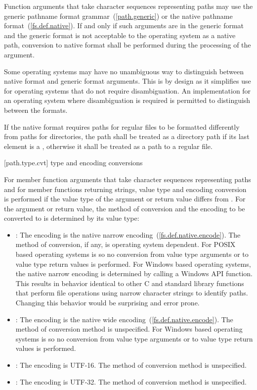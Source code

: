 \pnum
Function arguments that take character sequences representing
paths may use the generic pathname format grammar~(\ref{path.generic}) or
the native pathname format~(\ref{fs.def.native}). If and only if such
arguments are in the generic format and the generic format is not acceptable to
the operating system as a native path, conversion to native format shall be
performed during the processing of the argument.

\pnum
\enternote
Some operating systems may have no unambiguous way to distinguish between native format and generic format arguments.
This is by design as it simplifies use for operating systems that do not require
disambiguation. An implementation for an operating system where disambiguation
is required is permitted to distinguish between the formats.
\exitnote

\pnum
If the native format requires paths for regular files to be formatted
differently from paths for directories, the path shall be treated as a directory
path if its last element is a ,
otherwise it shall be treated as a path to a regular file.

[path.type.cvt]{ type and encoding conversions}

\pnum
For member function arguments that take character sequences representing
paths and for member functions returning strings, value type and encoding
conversion is performed if the value type of the argument or return value differs from
.
For the argument or return value, the method of conversion and the encoding 
to be converted to is determined
by its value type:
\begin{itemize}
\item {}: The encoding is the native narrow encoding~(\ref{fs.def.native.encode}).
The method of conversion, if any, is operating system dependent.
\enternote
For POSIX based operating systems  is 
so no conversion from  value type arguments or to 
value type return values is performed.
For Windows based operating systems, the
native narrow encoding is determined by calling a Windows API function.
\exitnote
\enternote
This results in behavior identical to other C and \Cpp
standard library functions that perform file operations using narrow character
strings to identify paths. Changing this behavior would be surprising and error
prone.
\exitnote
\item {}: The encoding is the native wide encoding~(\ref{fs.def.native.encode}).
The method of conversion method is unspecified.
\enternote
For Windows based operating systems  is 
so no conversion from  value type arguments or to 
value type return values is performed.
\exitnote
\item {}: The encoding is UTF-16. The method of conversion method
is unspecified.
\item {}: The encoding is UTF-32. The method of conversion method
is unspecified.
\end{itemize}

